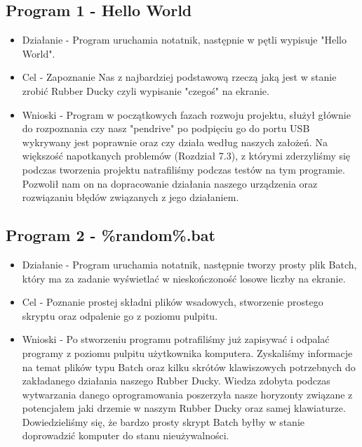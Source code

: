 \documentclass{article}
\begin{document}
\subsection{Program 1 - Hello World}
    \begin{itemize}
        \item Działanie - Program uruchamia notatnik, następnie w pętli wypisuje "Hello World".
        \item Cel - Zapoznanie Nas z najbardziej podstawową rzeczą jaką jest w stanie zrobić Rubber Ducky czyli wypisanie "czegoś" na ekranie.
        \item Wnioski - Program w początkowych fazach rozwoju projektu, służył głównie do rozpoznania czy nasz "pendrive" po podpięciu go do portu USB wykrywany jest poprawnie oraz czy działa według naszych założeń. Na większość napotkanych problemów (Rozdział 7.3), z którymi zderzyliśmy się podczas tworzenia projektu natrafiliśmy podczas testów na tym programie. Pozwolił nam on na dopracowanie działania naszego urządzenia oraz rozwiązaniu błędów związanych z jego działaniem.    
    \end{itemize}
\subsection{Program 2 - \%random\%.bat}
    \begin{itemize}
        \item Działanie - Program uruchamia notatnik, następnie tworzy prosty plik Batch, który ma za zadanie wyświetlać w nieskończoność losowe liczby na ekranie.
        \item Cel - Poznanie prostej składni plików wsadowych, stworzenie prostego skryptu oraz odpalenie go z poziomu pulpitu.
        \item Wnioski - Po stworzeniu programu potrafiliśmy już zapisywać i odpalać  programy z poziomu pulpitu użytkownika komputera. Zyskaliśmy informacje na temat plików typu Batch oraz kilku skrótów klawiszowych potrzebnych do zakładanego działania naszego Rubber Ducky. Wiedza zdobyta podczas wytwarzania danego oprogramowania poszerzyła nasze horyzonty związane z potencjałem jaki drzemie w naszym Rubber Ducky oraz samej klawiaturze. Dowiedzieliśmy się, że bardzo prosty skrypt Batch byłby w stanie doprowadzić komputer do stanu nieużywalności.
    
    \end{itemize}
\end{document}
